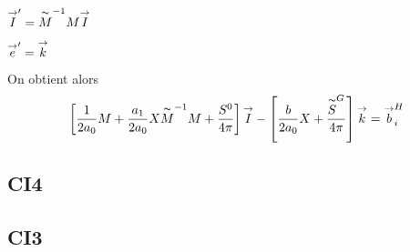     \(\vect I' = \tilde M^{-1}M\vect I\)

    \(\vect e' = \vect k\)

    On obtient alors 
    \[
    \left[\frac{1}{2a_0}M + \frac{a_1}{2a_0}X\tilde M^{-1}M + \frac{S^0}{4\pi}\right]\vect I - \left[\frac{b}{2a_0}X+ \frac{\tilde S^G}{4\pi}\right]\vect k = \vect b_i^H
    \]

    \subsection{CI4}
    \subsection{CI3}
